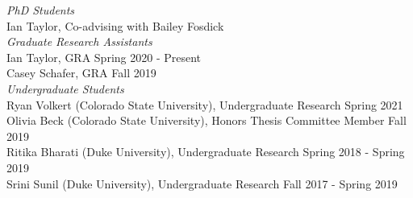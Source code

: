 \documentclass[margin,line]{res}
\begin{document}
\begin{resume}
{\em PhD Students} \hfill \\
Ian Taylor, Co-advising with Bailey Fosdick \\

\vspace{-.3cm}
{\em Graduate Research Assistants} \hfill \\
Ian Taylor, GRA \hfill Spring 2020 - Present \\
Casey Schafer, GRA \hfill Fall 2019 \\

\vspace{-.3cm}
{\em Undergraduate Students} \hfill \\
Ryan Volkert (Colorado State University), Undergraduate Research \hfill Spring 2021 \\
Olivia Beck (Colorado State University), Honors Thesis Committee Member \hfill Fall 2019 \\
Ritika Bharati (Duke University), Undergraduate Research \hfill Spring 2018 - Spring 2019\\
Srini Sunil (Duke University), Undergraduate Research \hfill Fall 2017 - Spring 2019



\end{resume}
\end{document}
